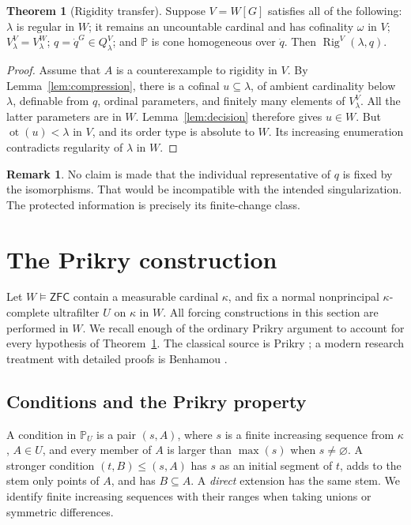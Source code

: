\documentclass[11pt,letterpaper]{article}
\theoremstyle{definition}
\newtheorem{theorem}[definition]{Theorem}
\newtheorem{remark}[definition]{Remark}
\numberwithin{equation}{section}
\newcommand{\ZFC}{\mathsf{ZFC}}
\newcommand{\ot}{\operatorname{ot}}
\newcommand{\PP}{\mathbb P}
\newcommand{\Rig}{\operatorname{Rig}}
\begin{document}
\begin{theorem}[Rigidity transfer]\label{thm:transfer}
Suppose $V=W[G]$ satisfies all of the following:
$\lambda$ is regular in $W$; it remains an uncountable cardinal and has
cofinality $\omega$ in $V$; $V_\lambda^V=V_\lambda^W$;
$q=\dot q^G\in Q_\lambda^V$; and $\PP$ is cone homogeneous over $\dot q$.
Then $\Rig^V(\lambda,q)$.
\end{theorem}
\begin{proof}
Assume that $A$ is a counterexample to rigidity in $V$. By
Lemma~\ref{lem:compression}, there is a cofinal $u\subseteq\lambda$,
of ambient cardinality below $\lambda$, definable from $q$, ordinal
parameters, and finitely many elements of $V_\lambda^V$.
All the latter parameters are in $W$. Lemma~\ref{lem:decision} therefore
gives $u\in W$. But $\ot(u)<\lambda$ in $V$, and its order type is
absolute to $W$. Its increasing enumeration contradicts regularity of
$\lambda$ in $W$.
\end{proof}

\begin{remark}
No claim is made that the individual representative of $q$ is fixed by the
isomorphisms. That would be incompatible with the intended singularization.
The protected information is precisely its finite-change class.
\end{remark}

\section{The Prikry construction}\label{sec:prikry}

Let $W\models\ZFC$ contain a measurable cardinal $\kappa$, and fix a
normal nonprincipal $\kappa$-complete ultrafilter $U$ on $\kappa$ in $W$.
All forcing constructions in this section are performed in $W$.
We recall enough of the ordinary Prikry argument to account for every
hypothesis of Theorem~\ref{thm:transfer}. The classical source is Prikry
\cite{Prikry}; a modern research treatment with detailed proofs is
Benhamou \cite{Benhamou}.

\subsection{Conditions and the Prikry property}

A condition in $\PP_U$ is a pair $(s,A)$, where $s$ is a finite increasing
sequence from $\kappa$, $A\in U$, and every member of $A$ is larger than
$\max(s)$ when $s\ne\varnothing$. A stronger condition $(t,B)\le(s,A)$
has $s$ as an initial segment of $t$, adds to the stem only points of $A$,
and has $B\subseteq A$. A \emph{direct} extension has the same stem.
We identify finite increasing sequences with their ranges when taking
unions or symmetric differences.
\end{document}
